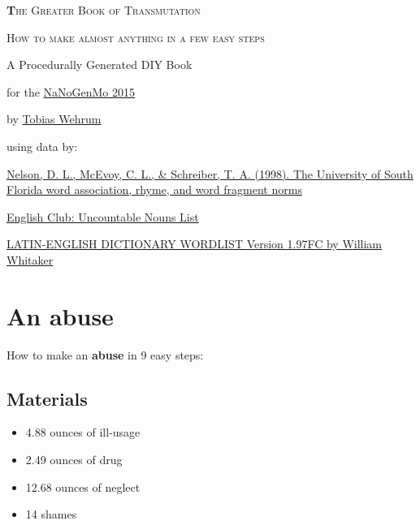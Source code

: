 \documentclass{article}
\title{}
\author{}
\date{}
\begin{document}
\begin{titlepage}
\centering
{\scshape\Huge\textbf The Greater Book of Transmutation \par}
\vspace{1.5cm}
{\scshape\large How to make almost anything in a few easy steps \par}
\vspace{5.5cm}
{\large A Procedurally Generated DIY Book \par}
{\large for the \href{https://github.com/dariusk/NaNoGenMo-2015}{NaNoGenMo 2015} \par}
\vspace{0.5cm}
{\large by \href{http://dragonlab.de}{Tobias Wehrum} \par}
\vfill
{\scriptsize using data by: \par}
\vspace{0.3cm}
{\scriptsize\href{http://web.usf.edu/FreeAssociation}{Nelson, D. L., McEvoy, C. L., \& Schreiber, T. A. (1998). The University of South Florida word association, rhyme, and word fragment norms}\par}
\vspace{0.3cm}
{\scriptsize\href{https://www.englishclub.com/vocabulary/nouns-uncountable-list.htm}{English Club: Uncountable Nouns List}\par}
\vspace{0.3cm}
{\scriptsize\href{http://archives.nd.edu/whitaker/dictpage.htm}{LATIN-ENGLISH DICTIONARY WORDLIST Version 1.97FC by William Whitaker}\par}
\vspace{0.5cm}
\end{titlepage}

\setcounter{tocdepth}{1}
\renewcommand*\contentsname{How to make...}
\tableofcontents
\newpage
\section{An abuse}How to make an \textbf{abuse} in 9 easy steps:

\subsection{Materials}\begin{itemize}
\item 
4.88 ounces of ill-usage
\item 
2.49 ounces of drug
\item 
12.68 ounces of neglect
\item 
14 shames
\end{itemize}
\end{document}
